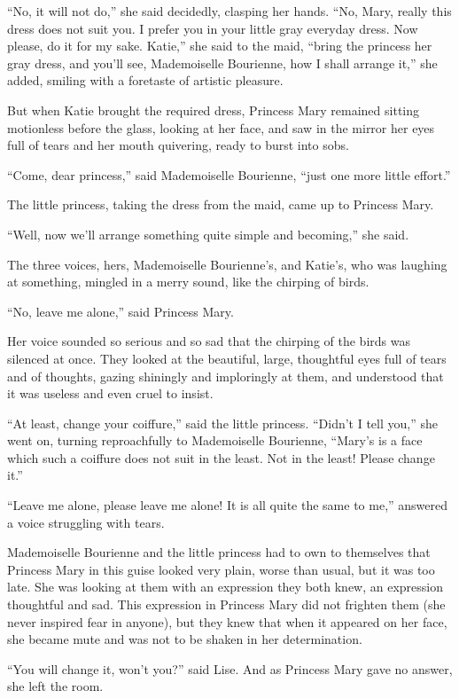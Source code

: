 ``No, it will not do,'' she said decidedly, clasping her
hands. ``No, Mary, really this dress does not suit you. I prefer
you in your little gray everyday dress. Now please, do it for my
sake. Katie,'' she said to the maid, ``bring the princess her
gray dress, and you'll see, Mademoiselle Bourienne, how I shall
arrange it,'' she added, smiling with a foretaste of artistic
pleasure.

But when Katie brought the required dress, Princess Mary remained
sitting motionless before the glass, looking at her face, and saw
in the mirror her eyes full of tears and her mouth quivering,
ready to burst into sobs.

``Come, dear princess,'' said Mademoiselle Bourienne, ``just one
more little effort.''

The little princess, taking the dress from the maid, came up to
Princess Mary.

``Well, now we'll arrange something quite simple and becoming,''
she said.

The three voices, hers, Mademoiselle Bourienne's, and Katie's,
who was laughing at something, mingled in a merry sound, like the
chirping of birds.

``No, leave me alone,'' said Princess Mary.

Her voice sounded so serious and so sad that the chirping of the
birds was silenced at once. They looked at the beautiful, large,
thoughtful eyes full of tears and of thoughts, gazing shiningly
and imploringly at them, and understood that it was useless and
even cruel to insist.

``At least, change your coiffure,'' said the little
princess. ``Didn't I tell you,'' she went on, turning
reproachfully to Mademoiselle Bourienne, ``Mary's is a face which
such a coiffure does not suit in the least. Not in the least!
Please change it.''

``Leave me alone, please leave me alone! It is all quite the same
to me,'' answered a voice struggling with tears.

Mademoiselle Bourienne and the little princess had to own to
themselves that Princess Mary in this guise looked very plain,
worse than usual, but it was too late. She was looking at them
with an expression they both knew, an expression thoughtful and
sad. This expression in Princess Mary did not frighten them (she
never inspired fear in anyone), but they knew that when it
appeared on her face, she became mute and was not to be shaken in
her determination.

``You will change it, won't you?'' said Lise. And as Princess
Mary gave no answer, she left the room.


